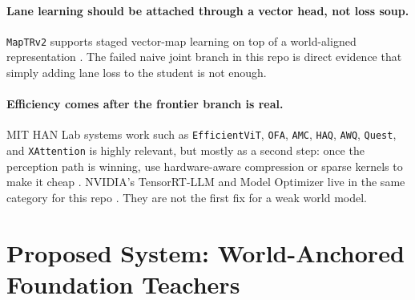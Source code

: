 \documentclass[11pt]{article}
\begin{document}
\paragraph{Lane learning should be attached through a vector head, not loss soup.}
\texttt{MapTRv2} supports staged vector-map learning on top of a world-aligned representation
\cite{maptrv2}. The failed naive joint branch in this repo is direct evidence that simply adding
lane loss to the student is not enough.

\paragraph{Efficiency comes after the frontier branch is real.}
MIT HAN Lab systems work such as \texttt{EfficientViT}, \texttt{OFA}, \texttt{AMC}, \texttt{HAQ},
\texttt{AWQ}, \texttt{Quest}, and \texttt{XAttention} is highly relevant, but mostly as a second
step: once the perception path is winning, use hardware-aware compression or sparse kernels to make
it cheap \cite{efficientvit,ofa,amc,haq,awq,quest,xattention}. NVIDIA's TensorRT-LLM and Model
Optimizer live in the same category for this repo \cite{trtllm,modelopt}. They are not the first
fix for a weak world model.

\section{Proposed System: World-Anchored Foundation Teachers}
\end{document}
